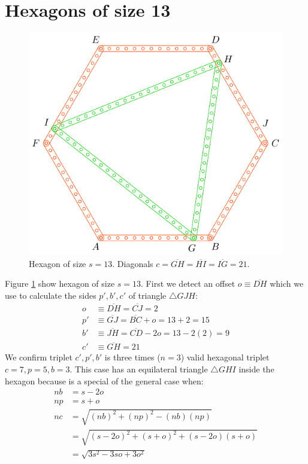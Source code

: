 \documentclass[11pt]{article}
\begin{document}
\section{Hexagons of size 13}

\begin{figure}[H]
\centering
\includegraphics[scale=1]{13/hexa-13a}
\caption{Hexagon of size $s = 13$. Diagonals $c = \overline{GH} = \overline{HI} = \overline{IG} = 21$.}
\label{fig:13a}
\end{figure}

Figure \ref{fig:13a} show hexagon of size $s = 13$. First we detect an offset $o \equiv \overline{DH}$ which we use to calculate the sides $p',b',c'$ of triangle $\triangle{GJH}$:
\begin{align}
o &\equiv \overline{DH} = \overline{CJ} = 2 \nonumber\\
p' &\equiv \overline{GJ} = \overline{BC} + o = 13+2 = 15 \nonumber\\
b' &\equiv \overline{JH} = \overline{CD} - 2o = 13 - 2(2) = 9 \nonumber\\
c' &\equiv \overline{GH} = 21
\end{align}
We confirm triplet $c',p',b'$ is three times ($n=3$) valid hexagonal triplet $c=7,p=5,b=3$.
This case has an equilateral triangle $\triangle{GHI}$ inside the hexagon because is a special of the general case when:
\begin{align}
nb &= s - 2o \nonumber\\
np &= s + o \nonumber\\
nc &= \sqrt{(nb)^2 + (np)^2 - (nb)(np)} \nonumber\\
   &= \sqrt{(s - 2o)^2 + (s+o)^2 + (s - 2o)(s+o)} \nonumber\\
   &= \sqrt{3s^2 - 3so + 3o^2}
\end{align}
\end{document}
